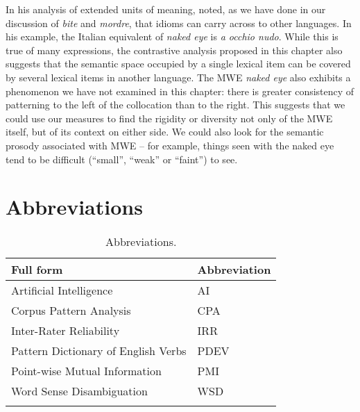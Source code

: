 \documentclass[output=paper]{langsci/langscibook}
\begin{document}
In his analysis of extended units of meaning, \cite{Sinclair:1991}  noted, as
we have done in our discussion of \textit{bite} and \textit{mordre}, that idioms can
carry across to other languages. In his example, the Italian equivalent
of \textit{naked eye} is \textit{a occhio nudo}. While this is true of many
expressions, the contrastive analysis proposed in this chapter also
suggests that the semantic space occupied by a single lexical item can
be covered by several lexical items in another language. The MWE \textit{naked eye} also exhibits a phenomenon we have not examined in this chapter:
there is greater consistency of patterning to the left of the
collocation than to the right. This suggests that we could use our
measures to find the rigidity or diversity not only of the MWE itself,
but of its context on either side. We could also look for the semantic
prosody associated with MWE – for example, things seen with the naked
eye tend to be difficult (“small”, “weak” or “faint”) to see. 


\section*{Abbreviations}


\begin{table}[H]
\begin{tabular}{ll}
\lsptoprule
Full form  & Abbreviation \\
\midrule
Artificial Intelligence & AI  \\
Corpus Pattern Analysis & CPA  \\
Inter-Rater Reliability & IRR \\
 Pattern Dictionary of English Verbs  & PDEV \\
 Point-wise Mutual Information & PMI \\
Word Sense Disambiguation & WSD  \\
\lspbottomrule
\end{tabular}
\caption{Abbreviations.}
\end{table}



\printbibliography[heading=subbibliography,notkeyword=this]
\end{document}
